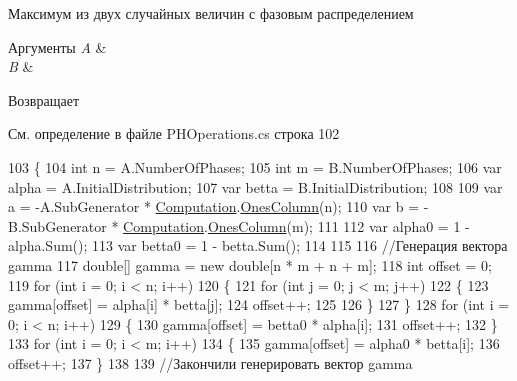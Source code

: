 Максимум из двух случайных величин с фазовым распределением 


\begin{DoxyParams}{Аргументы}
{\em A} & \\
\hline
{\em B} & \\
\hline
\end{DoxyParams}
\begin{DoxyReturn}{Возвращает}

\end{DoxyReturn}


См. определение в файле P\+H\+Operations.\+cs строка 102


\begin{DoxyCode}
103         \{
104             \textcolor{keywordtype}{int} n = A.NumberOfPhases;
105             \textcolor{keywordtype}{int} m = B.NumberOfPhases;
106             var alpha = A.InitialDistribution;
107             var betta = B.InitialDistribution;
108 
109             var a = -A.SubGenerator * \hyperlink{class_b_l_a_s_1_1_computation}{Computation}.\hyperlink{class_b_l_a_s_1_1_computation_ae7bf65dbabdb3c801ccddba5ed866b11}{OnesColumn}(n);
110             var b = -B.SubGenerator * \hyperlink{class_b_l_a_s_1_1_computation}{Computation}.\hyperlink{class_b_l_a_s_1_1_computation_ae7bf65dbabdb3c801ccddba5ed866b11}{OnesColumn}(m);
111 
112             var alpha0 = 1 - alpha.Sum();
113             var betta0 = 1 - betta.Sum();
114 
115 
116             \textcolor{comment}{//Генерация вектора gamma }
117             \textcolor{keywordtype}{double}[] gamma = \textcolor{keyword}{new} \textcolor{keywordtype}{double}[n * m + n + m];
118             \textcolor{keywordtype}{int} offset = 0;
119             \textcolor{keywordflow}{for} (\textcolor{keywordtype}{int} i = 0; i < n; i++)
120             \{
121                 \textcolor{keywordflow}{for} (\textcolor{keywordtype}{int} j = 0; j < m; j++)
122                 \{
123                     gamma[offset] = alpha[i] * betta[j];
124                     offset++;
125 
126                 \}
127             \}
128             \textcolor{keywordflow}{for} (\textcolor{keywordtype}{int} i = 0; i < n; i++)
129             \{
130                 gamma[offset] = betta0 * alpha[i];
131                 offset++;
132             \}
133             \textcolor{keywordflow}{for} (\textcolor{keywordtype}{int} i = 0; i < m; i++)
134             \{
135                 gamma[offset] = alpha0 * betta[i];
136                 offset++;
137             \}
138 
139             \textcolor{comment}{//Закончили генерировать вектор gamma }

\end{DoxyCode}
